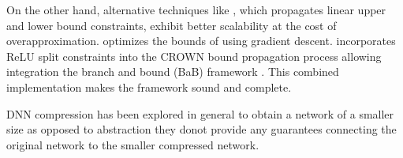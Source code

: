 On the other hand, alternative techniques like \cite{crown, deeppoly}, which
propagates linear upper and lower bound constraints, exhibit better
scalability at the cost of overapproximation. \cite{alpha-crown-bab-fnc} 
optimizes the bounds of \cite{crown} 
using gradient descent. 
\cite{beta-crown} incorporates ReLU split
constraints into the CROWN bound propagation process allowing integration
the branch and bound (BaB) framework \cite{bab-fw,bab-piecewise-nn, bab-lagrangian-decomp}. 
This combined implementation makes the \abcrown framework sound and complete.

DNN compression has been explored \cite{dnn-compression} in general to obtain a
network of a smaller size as opposed to abstraction they donot provide any guarantees
connecting the original network to the smaller compressed network. 
